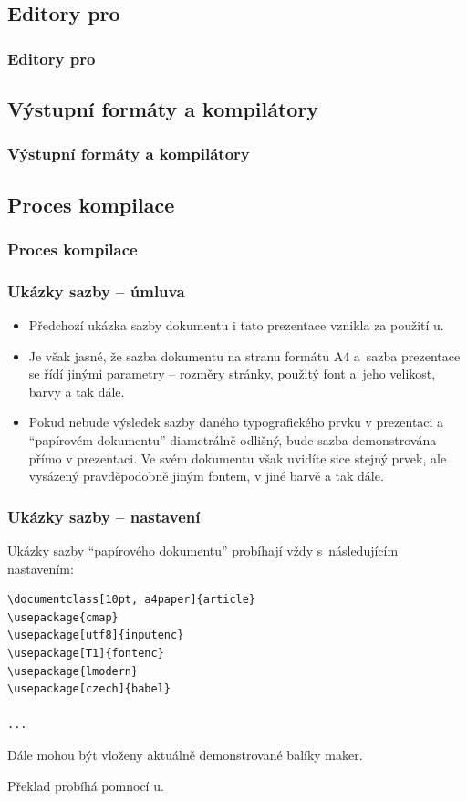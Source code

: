 \subsection{Editory pro }
\begin{frame}
	\frametitle{Editory pro }
\end{frame}


\subsection{Výstupní formáty a kompilátory}
\begin{frame}
	\frametitle{Výstupní formáty a kompilátory}
\end{frame}


\subsection{Proces kompilace}
\begin{frame}
	\frametitle{Proces kompilace}
\end{frame}


\begin{frame}
	\frametitle{Ukázky sazby -- úmluva}
	\begin{itemize}
		\item Předchozí ukázka sazby dokumentu i tato prezentace vznikla za použití u.
		\item Je však jasné, že sazba dokumentu na stranu formátu A4 a~sazba prezentace se řídí jinými parametry -- rozměry stránky, použitý font a~jeho velikost, barvy a tak dále.
		\item Pokud nebude výsledek sazby daného typografického prvku v prezentaci a \enquote{papírovém dokumentu} diametrálně odlišný, bude sazba demonstrována přímo v prezentaci. Ve svém dokumentu však uvidíte sice stejný prvek, ale vysázený pravděpodobně jiným fontem, v jiné barvě a tak dále.
	\end{itemize}
\end{frame}


\begin{frame}
	\frametitle{Ukázky sazby -- nastavení}
	Ukázky sazby \enquote{papírového dokumentu} probíhají vždy s~následujícím nastavením:\par
	\begin{BVerbatim}
\documentclass[10pt, a4paper]{article}
\usepackage{cmap}
\usepackage[utf8]{inputenc}
\usepackage[T1]{fontenc}
\usepackage{lmodern}
\usepackage[czech]{babel}

...

	\end{BVerbatim}
	\par
	 Dále mohou být vloženy aktuálně demonstrované balíky maker.\par
	 Překlad probíhá pomnocí u.
\end{frame}

\endinput
